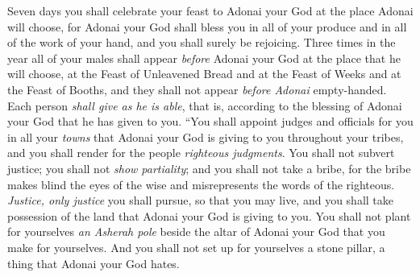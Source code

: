 \begin{biblechapter}
\verse Seven days you shall celebrate your feast to Adonai your God at the place Adonai will choose, for Adonai your God shall bless you in all of your produce and in all of the work of your hand, and you shall surely be rejoicing.
\verse Three times in the year all of your males shall appear \textit{before } Adonai your God at the place that he will choose, at the Feast of Unleavened Bread and at the Feast of Weeks and at the Feast of Booths, and they shall not appear \textit{before Adonai} empty-handed.
\verse Each person \textit{shall give as he is able}, that is, according to the blessing of Adonai your God that he has given to you.
\verse “You shall appoint judges and officials for you in all your \textit{towns} that Adonai your God is giving to you throughout your tribes, and you shall render for the people \textit{righteous judgments}.
\verse You shall not subvert justice; you shall not \textit{show partiality}; and you shall not take a bribe, for the bribe makes blind the eyes of the wise and misrepresents the words of the righteous.
\verse \textit{Justice, only justice} you shall pursue, so that you may live, and you shall take possession of the land that Adonai your God is giving to you.
\verse You shall not plant for yourselves \textit{an Asherah pole} beside the altar of Adonai your God that you make for yourselves.
\verse And you shall not set up for yourselves a stone pillar, a thing that Adonai your God hates.
\end{biblechapter}

